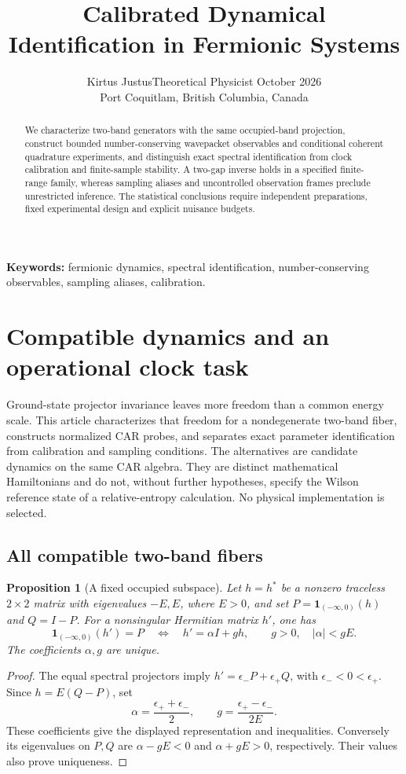 \documentclass[11pt]{article}
\title{Calibrated Dynamical Identification in Fermionic Systems}
\author{Kirtus Justus\enspace\textbullet\enspace Theoretical Physicist\enspace\textbullet\enspace 23 October 2026\\Port Coquitlam, British Columbia, Canada}
\date{}
\newtheorem{proposition}[theorem]{Proposition}
\theoremstyle{definition}
\begin{document}
\maketitle
\begin{abstract}
We characterize two-band generators with the same occupied-band projection, construct bounded number-conserving wavepacket observables and conditional coherent quadrature experiments, and distinguish exact spectral identification from clock calibration and finite-sample stability. A two-gap inverse holds in a specified finite-range family, whereas sampling aliases and uncontrolled observation frames preclude unrestricted inference. The statistical conclusions require independent preparations, fixed experimental design and explicit nuisance budgets.
\end{abstract}
\noindent\textbf{Keywords:} fermionic dynamics, spectral identification, number-conserving observables, sampling aliases, calibration.

\section{Compatible dynamics and an operational clock task}
\label{app:operational-clock}

Ground-state projector invariance leaves more freedom than a common energy scale. This article characterizes
that freedom for a nondegenerate two-band fiber, constructs normalized CAR
probes, and separates exact parameter identification from calibration and
sampling conditions. The alternatives are candidate dynamics on the same
CAR algebra. They are distinct mathematical Hamiltonians and do not, without further hypotheses, specify the Wilson reference state of a relative-entropy calculation. No physical implementation is selected.

\subsection{All compatible two-band fibers}

\begin{proposition}[A fixed occupied subspace]
\label{prop:operational-projector-class}
Let $h=h^*$ be a nonzero traceless $2\times2$ matrix with eigenvalues
$-E,E$, where $E>0$, and set $P=\mathbf1_{(-\infty,0)}(h)$ and $Q=I-P$.
For a \emph{nonsingular} Hermitian matrix $h'$, one has
\begin{equation}
 \mathbf1_{(-\infty,0)}(h')=P
 \quad\Longleftrightarrow\quad
 h'=\alpha I+g h,\qquad g>0,\quad |\alpha|<gE .
 \label{eq:operational-compatible-class}
\end{equation}
The coefficients $\alpha,g$ are unique.
\end{proposition}
\begin{proof}
The equal spectral projectors imply
$h'=\epsilon_-P+\epsilon_+Q$, with $\epsilon_-<0<\epsilon_+$.
Since $h=E(Q-P)$, set
\[
 \alpha=\frac{\epsilon_++\epsilon_-}{2},\qquad
 g=\frac{\epsilon_+-\epsilon_-}{2E}.
\]
These coefficients give the displayed representation and inequalities.
Conversely its eigenvalues on $P,Q$ are $\alpha-gE<0$ and
$\alpha+gE>0$, respectively. Their values also prove uniqueness.
\end{proof}
\end{document}
